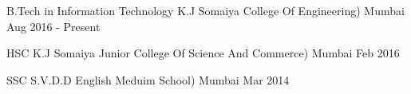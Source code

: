 

\begin{cventries}

  \cventry
    {B.Tech in Information Technology} %
    {K.J Somaiya College Of Engineering)} %
    {Mumbai} %
    {Aug 2016 - Present} %
    {
      
    }

\cventry
    {HSC} %
    {K.J Somaiya Junior College Of Science And Commerce)} %
    {Mumbai} %
    {Feb 2016} %
    {
      
    }

\end{cventries}
\cventry
    {SSC} %
    {S.V.D.D English Meduim School)} %
    {Mumbai} %
    {Mar 2014} %
    {
      
    }
